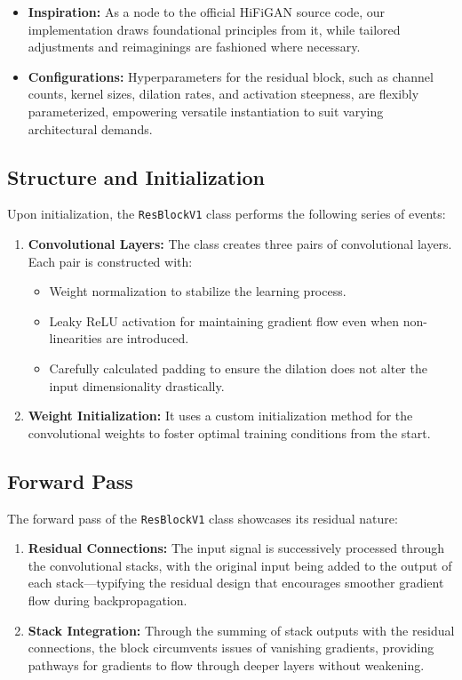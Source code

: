 \documentclass[a4paper]{article}
\begin{document}
\begin{itemize}
  \item \textbf{Inspiration:} As a node to the official HiFiGAN source code, our implementation draws foundational principles from it, while tailored adjustments and reimaginings are fashioned where necessary.
  
  \item \textbf{Configurations:} Hyperparameters for the residual block, such as channel counts, kernel sizes, dilation rates, and activation steepness, are flexibly parameterized, empowering versatile instantiation to suit varying architectural demands.
\end{itemize}

\subsection{Structure and Initialization}

Upon initialization, the \texttt{ResBlockV1} class performs the following series of events:

\begin{enumerate}
  \item \textbf{Convolutional Layers:} The class creates three pairs of convolutional layers. Each pair is constructed with:
    \begin{itemize}
      \item Weight normalization to stabilize the learning process.
      \item Leaky ReLU activation for maintaining gradient flow even when non-linearities are introduced.
      \item Carefully calculated padding to ensure the dilation does not alter the input dimensionality drastically.
    \end{itemize}
  \item \textbf{Weight Initialization:} It uses a custom initialization method for the convolutional weights to foster optimal training conditions from the start.
\end{enumerate}

\subsection{Forward Pass}

The forward pass of the \texttt{ResBlockV1} class showcases its residual nature:

\begin{enumerate}
  \item \textbf{Residual Connections:} The input signal is successively processed through the convolutional stacks, with the original input being added to the output of each stack—typifying the residual design that encourages smoother gradient flow during backpropagation.
  
  \item \textbf{Stack Integration:} Through the summing of stack outputs with the residual connections, the block circumvents issues of vanishing gradients, providing pathways for gradients to flow through deeper layers without weakening.
\end{enumerate}
\end{document}
